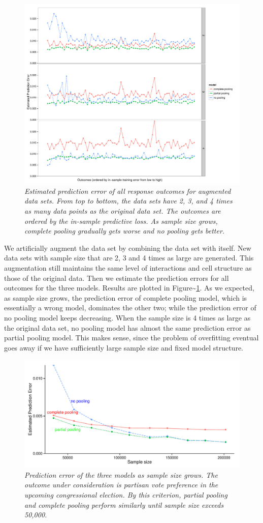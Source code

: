 \documentclass[11pt,article,oneside]{memoir}
\begin{document}
\begin{figure}[p]
  \centering
  \includegraphics[width=.45\textwidth]{outcome234.pdf}
  \caption{\em Estimated prediction error of all response outcomes for augmented
    data sets. From top to bottom, the data sets have 2, 3, and 4 times as many
    data points as the original data set. The outcomes are ordered by the
    in-sample predictive loss. As sample size grows, complete pooling
    gradually gets worse and no pooling gets better.}
  \label{fig:figx234}
\end{figure}

We artificially augment the data set by combining the data set with
itself. New data sets with sample size that are 2, 3 and 4 times as
large are generated. This augmentation still maintains the same level of
interactions and cell structure as those of the original data. Then we
estimate the prediction errors for all outcomes for the three models.
Results are plotted in Figure\textasciitilde{}\ref{fig:figx234}. As we
expected, as sample size grows, the prediction error of complete pooling
model, which is essentially a wrong model, dominates the other two;
while the prediction error of no pooling model keeps decreasing. When
the sample size is 4 times as large as the original data set, no pooling
model has almost the same prediction error as partial pooling model.
This makes sense, since the problem of overfitting eventual goes away if
we have sufficiently large sample size and fixed model structure.

\begin{figure}
  \centering
  \includegraphics[width=.85\textwidth]{hourvote.pdf}
  \caption{\em Prediction error of the three models as sample size grows. The
    outcome under consideration is partisan vote preference in the upcoming
    congressional election. By this criterion, partial pooling and complete
    pooling perform similarly until sample size exceeds 50,000.}
  \label{fig:hourvote}
\end{figure}
\end{document}
